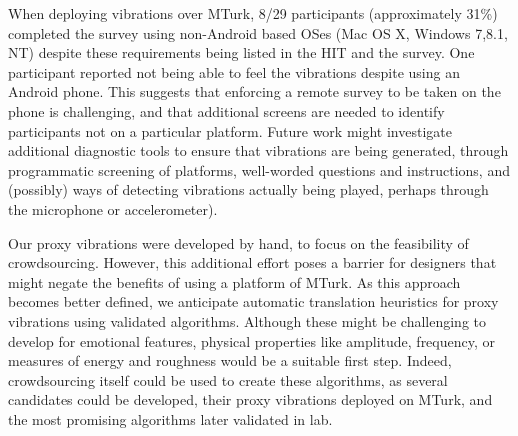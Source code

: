 When deploying vibrations over MTurk, 8/29 participants (approximately 31\%) completed the survey using non-Android based OSes (Mac OS X, Windows 7,8.1, NT) despite these requirements being listed in the HIT and the survey. One participant reported not being able to feel the vibrations despite using an Android phone. 
This suggests that enforcing a remote survey to be taken on the phone is challenging, and that additional screens are needed to identify participants not on a particular platform.
Future work might investigate additional diagnostic tools to ensure that vibrations are being generated, through programmatic screening of platforms, well-worded questions and instructions, and (possibly) ways of detecting vibrations actually being played, perhaps through the microphone or accelerometer).



Our proxy vibrations were developed by hand, to focus on the feasibility of crowdsourcing.
However, this additional effort poses a barrier for designers that might negate the benefits of using a platform of MTurk.
As this approach becomes better defined, we anticipate automatic translation heuristics for proxy vibrations using validated algorithms.
Although these might be challenging to develop for %
emotional features, physical properties like amplitude, frequency, or measures of energy and roughness would be a suitable first step.
Indeed, crowdsourcing itself could be used to create these algorithms, as several candidates could be developed, their proxy vibrations deployed on MTurk, and the most promising algorithms later validated in lab.



        
       
        
        
        

        
        

